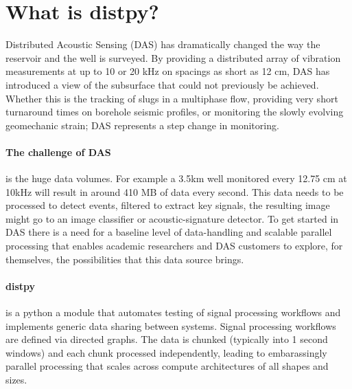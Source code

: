 \section{What is distpy?}

Distributed Acoustic Sensing (DAS) has dramatically changed the way the reservoir and the well is surveyed. 
By providing a distributed array of vibration measurements at up to 10 or 20 kHz on spacings as short as 12 cm, DAS has 
introduced a view of the subsurface that could not previously be achieved. Whether this is the tracking of slugs in a multiphase flow,
 providing very short turnaround times on borehole seismic profiles, or monitoring the slowly evolving geomechanic strain; DAS represents
 a step change in monitoring.
 \paragraph{The challenge of DAS} 
 is the huge data volumes. For example a 3.5km well monitored every 12.75 cm at 10kHz will result in around 410 MB of data every second.
This data needs to be processed to detect events, filtered to extract key signals, the resulting image might go to an image classifier or acoustic-signature detector.
To get started in DAS there is a need for a baseline level of data-handling and scalable parallel processing that enables academic researchers and
DAS customers to explore, for themselves, the possibilities that this data source brings.
 \paragraph{distpy}
is a python a module that automates testing of signal processing workflows and implements generic data sharing between systems.
Signal processing workflows are defined via directed graphs. 
The data is chunked (typically into 1 second windows) and each chunk processed independently, leading to embarassingly parallel processing 
that scales across compute architectures of all shapes and sizes.

